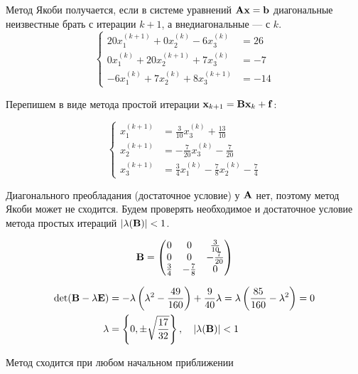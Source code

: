 \documentclass[professionalfonts,compress,unicode]{beamer}
\begin{document}
{
	Метод Якоби получается, если в системе уравнений ${\bf A}{\bf x} = {\bf b}$ 
	диагональные неизвестные брать с итерации $k+1$, а внедиагональные --- с $k$.
	\begin{equation*}
	\begin{cases}
	20x_1^{(k+1)} + 0x_2^{(k)}  -6 x_3^{(k)} &= 26\\
	0x_1^{(k)} + 20x_2^{(k+1)} + 7x_3^{(k)}  &= -7\\
	-6x_1^{(k)} + 7x_2^{(k)} + 8x_3^{(k+1)} &= -14 
	\end{cases}
	\end{equation*}

	Перепишем в виде метода простой итерации ${\bf x}_{k+1} = {\bf B} {\bf x}_k + {\bf f}$:

	\begin{equation*}
	\begin{cases}
	x_1^{(k+1)} &= \frac{3}{10} x_3^{(k)} + \frac{13}{10}\\
	x_2^{(k+1)} &= -\frac{7}{20} x_3^{(k)} - \frac{7}{20}\\
	x_3^{(k+1)} &= \frac{3}{4} x_1^{(k)} -\frac{7}{8} x_2^{(k)} -\frac{7}{4}
	\end{cases}
	\end{equation*}
}

{
	Диагонального преобладания (достаточное условие) у ${\bf A}$ нет, поэтому метод
	Якоби может не сходится. Будем проверять необходимое и достаточное условие 
	метода простых итераций $|\lambda({\bf B})| < 1$.

	\begin{equation*}
	{\bf B} = \begin{pmatrix}
		0 & 0 & \frac{3}{10}\\
		0 & 0 & -\frac{7}{20}\\
		\frac{3}{4} & -\frac{7}{8} & 0
	\end{pmatrix}
	\end{equation*}

	\begin{align*}
	\operatorname{det}({\bf B} - \lambda {\bf E}) &= -\lambda\left(\lambda^2 - \frac{49}{160}\right) + \frac{9}{40}\lambda = 
	\lambda \left(\frac{85}{160} - \lambda^2\right) = 0\\
	\lambda &= \left\{ 0, \pm \sqrt{\frac{17}{32}} \right\}, \quad |\lambda({\bf B})| < 1
	\end{align*}

	Метод сходится при любом начальном приближении
}
\end{document}
